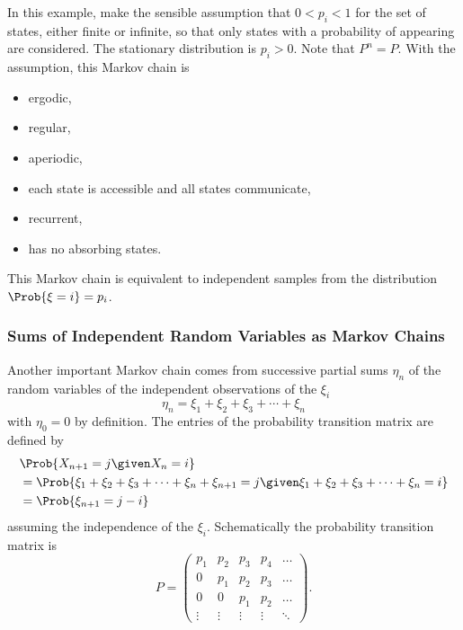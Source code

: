 \documentclass[12pt]{article}
\begin{document}
In this example, make the sensible assumption that \( 0 < p_i < 1 \) for the
set of states, either finite or infinite, so that only states with a
probability of appearing are considered.  The stationary distribution is
\( p_i > 0 \).  Note that \( P^n = P \).  With the assumption,
this Markov chain is
\begin{itemize}
    \item
        ergodic,
    \item
        regular,
    \item
        aperiodic,
    \item
        each state is accessible and all states communicate,
    \item
        recurrent,
    \item
        has no absorbing states.
\end{itemize}
This Markov chain is equivalent to independent samples from the
distribution \( \Prob{\xi=i} = p_i \).

\subsubsection*{Sums of Independent Random Variables as Markov Chains}

Another important Markov chain comes from successive partial sums \(
\eta_n \) of the random variables of the independent observations of the
\( \xi_i \)
\[
    \eta_n = \xi_1 + \xi_2 + \xi_3 + \cdots + \xi_n
\] with \( \eta_0 = 0 \) by definition.%
The entries of the probability transition matrix are defined by
\begin{align*}
  &\Prob{X_{n+1} = j \given X_n = i} \\
  & = \Prob{\xi_1 + \xi_2 + \xi_3 +
    \cdots + \xi_n + \xi_{n+1} = j \given \xi_1 + \xi_2 + \xi_3 +
    \cdots + \xi_n = i} \\
  & = \Prob{\xi_{n+1} = j-i}
\end{align*}    
assuming the independence of the \( \xi_i \).  Schematically the
probability transition matrix is
\[
    P =
    \begin{pmatrix}
        p_1 & p_2 & p_3 & p_4 & \dots \\
        0 & p_1 & p_2 & p_3 & \dots \\
        0 & 0 & p_1 & p_2 & \dots \\
        \vdots & \vdots & \vdots & \vdots & \ddots
    \end{pmatrix}.
\]
\end{document}
